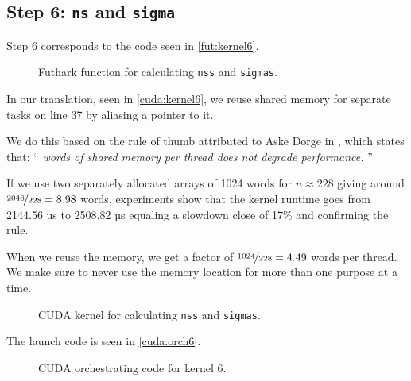 \subsection{
    Step 6: \texttt{ns} and \texttt{sigma}
}

Step 6 corresponds to the code seen in \autoref{fut:kernel6}.

\begin{figure}[H]
    \centering
    \caption{Futhark function for calculating \texttt{nss} and \texttt{sigmas}.}
    \label{fut:kernel6}
\end{figure}

In our translation, seen in \autoref{cuda:kernel6},
we reuse shared memory for separate tasks on line 37 by aliasing a pointer to
it. 

We do this based on the rule of thumb attributed to Aske Dorge in \cite[p.
29]{pmphL5}, which states that:
\enquote{
    \textit{
         words of shared memory per thread does not degrade performance.
}}

If we use two separately allocated arrays of 1024 words for \(n\approx228\)
giving around \(\nicefrac{2048}{228} = 8.98\) words, experiments show that
the kernel runtime goes from 2144.56 µs to
2508.82 µs equaling a slowdown close of 17\% and confirming the rule.

When we reuse the memory, we get a factor of \(\nicefrac{1024}{228} = 4.49\)
words per thread. We make sure to never use the memory location for more than
one purpose at a time.

\begin{figure}[H]
    \centering
    \caption{CUDA kernel for calculating \texttt{nss} and \texttt{sigmas}.}
    \label{cuda:kernel6}
\end{figure}

The launch code is seen in \autoref{cuda:orch6}.

\begin{figure}[H]
    \centering
    \caption{CUDA orchestrating code for kernel 6.}
    \label{cuda:orch6}
\end{figure}

